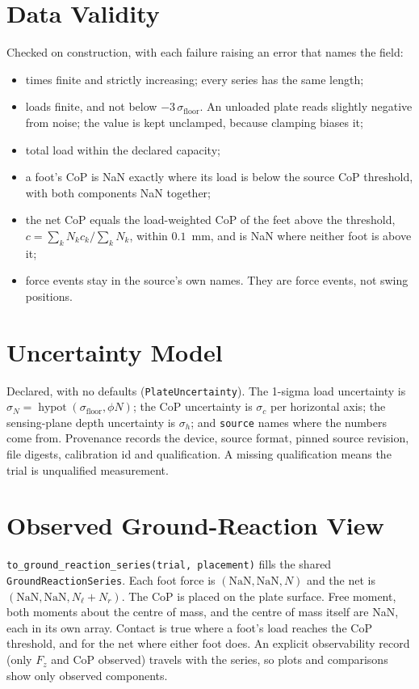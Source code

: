 \documentclass[11pt]{article}
\begin{document}
\section{Data Validity}

Checked on construction, with each failure raising an error that names the
field:
\begin{itemize}
  \item times finite and strictly increasing; every series has the same
        length;
  \item loads finite, and not below $-3\,\sigma_{\mathrm{floor}}$. An unloaded
        plate reads slightly negative from noise; the value is kept
        unclamped, because clamping biases it;
  \item total load within the declared capacity;
  \item a foot's CoP is NaN exactly where its load is below the source CoP
        threshold, with both components NaN together;
  \item the net CoP equals the load-weighted CoP of the feet above the
        threshold, $c = \sum_k N_k c_k / \sum_k N_k$, within $0.1$~mm, and
        is NaN where neither foot is above it;
  \item force events stay in the source's own names. They are force events,
        not swing positions.
\end{itemize}

\section{Uncertainty Model}

Declared, with no defaults (\texttt{PlateUncertainty}). The 1-sigma load
uncertainty is $\sigma_N = \operatorname{hypot}(\sigma_{\mathrm{floor}},
\phi N)$; the CoP uncertainty is $\sigma_c$ per horizontal axis; the
sensing-plane depth uncertainty is $\sigma_h$; and \texttt{source} names
where the numbers come from. Provenance records the device, source format,
pinned source revision, file digests, calibration id and qualification. A
missing qualification means the trial is unqualified measurement.

\section{Observed Ground-Reaction View}

\texttt{to\_ground\_reaction\_series(trial, placement)} fills the shared
\texttt{GroundReactionSeries}. Each foot force is $(\mathrm{NaN}, \mathrm{NaN},
N)$ and the net is $(\mathrm{NaN}, \mathrm{NaN}, N_\ell + N_r)$. The CoP is
placed on the plate surface. Free moment, both moments about the centre of
mass, and the centre of mass itself are NaN, each in its own array. Contact
is true where a foot's load reaches the CoP threshold, and for the net where
either foot does. An explicit observability record (only $F_z$ and CoP
observed) travels with the series, so plots and comparisons show only
observed components.
\end{document}
